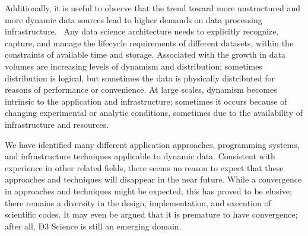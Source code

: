 Additionally, it is useful to observe that the trend toward more
unstructured and more dynamic data sources lead to higher demands on
data processing infrastructure.~\cite{snia_2012}
Any data science architecture needs to
explicitly recognize, capture, and manage the lifecycle requirements
of different datasets, within the constraints of available time and
storage. Associated with the growth in data volumes are increasing
levels of dynamism and distribution; sometimes distribution is
logical, but sometimes the data is physically distributed for reasons
of performance or convenience. At large scales, dynamism becomes
intrinsic to the application and infrastructure; sometimes it occurs
because of changing experimental or analytic conditions, sometimes due
to the availability of infrastructure and resources.

We have identified many different application approaches, programming
systems, and infrastructure techniques applicable to dynamic data.
Consistent with experience in other related fields, there seems no
reason to expect that these approaches and techniques will disappear
in the near future. While a convergence in approaches and techniques
might be expected, this has proved to be elusive; there remains a
diversity in the design, implementation, and execution of scientific
codes.  It may even be argued that it is premature to have convergence;
after all, D3 Science is still an emerging domain.

